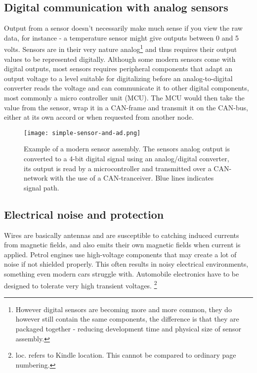\subsection{Digital communication with analog sensors}
Output from a sensor doesn't necessarily make much sense if you view the raw data, 
for instance - a temperature sensor might give outputs between 0 and 5 volts.
Sensors are in their very nature analog\footnote{However digital sensors are
becoming more and more common, they do however still contain the same
components, the difference is that they are packaged together - reducing development
time and physical size of sensor assembly.} and thus requires their output
values to be represented digitally. Although some modern sensors come with
digital outputs, most sensors requires peripheral components that adapt an
output voltage to a level suitable for digitalizing before an analog-to-digital
converter reads the voltage and can communicate it to other digital components,
most commonly a micro controller unit (MCU). The MCU would then take the value
from the sensor, wrap it in a CAN-frame and transmit it on the
CAN-bus, either at its own accord or when requested from another node. \cite[loc. 5020-5203,
5732-7565]{catsoulis:embedded}\cite{can-appnote}
\begin{figure}[!htbp]
	\texttt{[image: simple-sensor-and-ad.png]}
	\caption{Example of a modern sensor assembly. The sensors analog output is converted to a
	4-bit
	digital signal using an analog/digital converter, its output is read by a
	microcontroller and transmitted over a CAN-network with the use of a
	CAN-tranceiver. Blue lines indicates signal path.}
	\label{fig:simple-sensor}
\end{figure}


\subsection{Electrical noise and protection}
Wires are basically antennas and are susceptible to catching induced currents
from magnetic fields, and also emits their own magnetic fields when current is
applied. Petrol engines use high-voltage components that may create a lot of
noise if not shielded properly. This often results in noisy electrical
environments, something even modern cars struggle with. Automobile electronics
have to be designed to tolerate very high transient voltages. \cite[loc. 2562]{catsoulis:embedded}\footnote{loc. refers to Kindle location. This cannot be compared to ordinary page numbering.}

